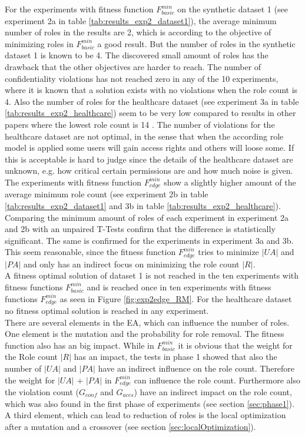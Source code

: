 For the experiments with fitness function $F_{basic}^{min}$ on the synthetic dataset 1 (see experiment 2a in table \ref{tab:results_exp2_dataset1}), the average minimum number of roles in the results are 2, which is according to the objective of minimizing roles in $F_{basic}^{min}$ a good result. But the number of roles in the synthetic dataset 1 is known to be 4. The discovered small amount of roles has the drawback that the other objectives are harder to reach. The number of confidentiality violations has not reached zero in any of the 10 experiments, where it is known that a solution exists with no violations when the role count is 4. Also the number of roles for the healthcare dataset (see experiment 3a in table \ref{tab:results_exp2_healthcare}) seem to be very low compared to results in other papers where the lowest role count is 14 \cite{Ene}\cite{Molloy:2009:ERM:1542207.1542224}. The number of violations for the healthcare dataset are not optimal, in the sense that when the according role model is applied some users will gain access rights and others will loose some. If this is acceptable is hard to judge since the details of the healthcare dataset are unknown, e.g. how critical certain permissions are and how much noise is given.\\
The experiments with fitness function $F_{edge}^{min}$ show a slightly higher amount of the average minimum role count (see experiment 2b in table \ref{tab:results_exp2_dataset1} and 3b in table \ref{tab:results_exp2_healthcare}). Comparing the minimum amount of roles of each experiment in experiment 2a and 2b with an unpaired T-Tests confirm that the difference is statistically significant. The same is confirmed for the experiments in experiment 3a and 3b. This seem reasonable, since the fitness function $F_{edge}^{min}$ tries to minimize $|UA|$ and $|PA|$ and only has an indirect focus on minimizing the role count $|R|$.\\
A fitness optimal solution of dataset 1 is not reached in the ten experiments with fitness functions $F_{basic}^{min}$ and is reached once in ten experiments with fitness functions $F_{edge}^{min}$ as seen in Figure \ref{fig:exp2edge_RM}. For the healthcare dataset no fitness optimal solution is reached in any experiment.\\
There are several elements in the EA, which can influence the number of roles. One element is the mutation and the probability for role removal. The fitness function also has an big impact. While in $F_{basic}^{min}$ it is obvious that the weight for the Role count $|R|$ has an impact, the tests in phase 1 showed that also the number of $|UA|$ and $|PA|$ have an indirect influence on the role count. Therefore the weight for $|UA|$ + $|PA|$ in $F_{edge}^{min}$ can influence the role count. Furthermore also the violation count ($G_{conf}$ and $G_{accs}$) have an indirect impact on the role count, which was also found in the first phase of experiments (see section \ref{sec:phase1}). A third element, which can lead to reduction of roles is the local optimization after a mutation and a crossover (see section \ref{sec:localOptimization}).\\
